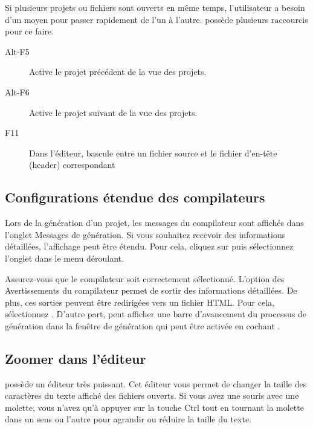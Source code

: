 Si plusieurs projets ou fichiers sont ouverts en même temps, l'utilisateur a besoin d'un moyen pour passer rapidement de l'un à l'autre. \codeblocks possède plusieurs raccourcis pour ce faire.

\begin{description}
\item[Alt-F5] Active le projet précédent de la vue des projets.
\item[Alt-F6] Active le projet suivant de la vue des projets.
\item[F11] Dans l'éditeur, bascule entre un fichier source  et le fichier d'en-tête (header) correspondant 
\end{description}

\subsection{Configurations étendue des compilateurs}

Lors de la génération d'un projet, les messages du compilateur sont affichés dans l'onglet Messages de génération. Si vous souhaitez recevoir des informations détaillées, l'affichage peut être étendu. Pour cela, cliquez sur  puis sélectionnez l'onglet  dans le menu déroulant.


Assurez-vous que le compilateur soit correctement sélectionné. L'option  des Avertissements du compilateur permet de sortir des informations détaillées. De plus, ces sorties peuvent être redirigées vers un fichier HTML. Pour cela, sélectionnez  .
D'autre part, \codeblocks peut afficher une barre d'avancement du processus de génération dans la fenêtre de génération qui peut être activée en cochant .

\subsection{Zoomer dans l'éditeur}

\codeblocks possède un éditeur très puissant. Cet éditeur vous permet de changer la taille des caractères du texte affiché des fichiers ouverts. Si vous avez une souris avec une molette, vous n'avez qu'à appuyer sur la touche Ctrl tout en tournant la molette dans un sens ou l'autre pour agrandir ou réduire la taille du texte.

